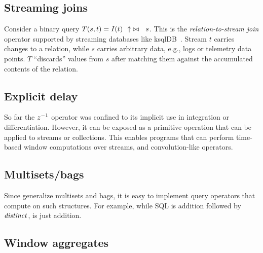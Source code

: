 \subsection{Streaming joins}

Consider a binary query $T(s, t) = \mathit{I}(t)~~{\uparrow}\bowtie~~s$.  This is the
\emph{relation-to-stream join} operator supported by streaming databases like ksqlDB~\cite{jafarpour-edbt19}.
Stream $t$ carries changes to a relation, while $s$ carries arbitrary data, e.g., logs
or telemetry data points. $T$ ``discards'' values from $s$ after matching them against the accumulated contents of the relation.

\begin{center}
\noindent
{}
\end{center}

\subsection{Explicit delay}

So far the $z^{-1}$ operator was confined to its implicit use in integration or
differentiation.  However, it can be exposed as a primitive operation that
can be applied to streams or collections.  This enables programs that can
perform time-based window computations over streams, and convolution-like
operators.


\subsection{Multisets/bags}

Since \zrs generalize multisets and bags, it is easy to implement query
operators that compute on such structures.  For example, while SQL 
is \zr addition followed by $\mathit{distinct}$,  is just \zr addition.


\subsection{Window aggregates}


